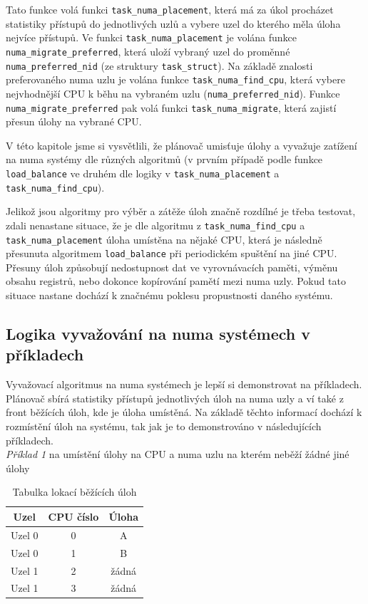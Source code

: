 \documentclass[
  field=ainfk,
  biblatex,
  glossaries,
  index
]{kidiplom}
\begin{document}
Tato funkce volá funkci \verb#task_numa_placement#, která má za úkol procházet statistiky přístupů do jednotlivých uzlů a vybere uzel do kterého měla úloha nejvíce přístupů. Ve funkci \verb#task_numa_placement# je volána funkce \newline \verb#numa_migrate_preferred#, která uloží vybraný uzel do proměnné \newline \verb#numa_preferred_nid# (ze struktury \verb#task_struct#).
Na základě znalosti preferovaného numa uzlu je volána funkce \verb#task_numa_find_cpu#, která vybere nejvhodnější CPU k běhu na vybraném uzlu (\verb#numa_preferred_nid#).
Funkce \verb#numa_migrate_preferred# pak volá funkci \verb#task_numa_migrate#, která zajistí přesun úlohy na vybrané CPU.

V této kapitole jsme si vysvětlili, že plánovač umisťuje úlohy a vyvažuje zatížení na numa systémy dle různých algoritmů (v prvním případě podle funkce \verb#load_balance# ve druhém dle logiky v \verb#task_numa_placement# a \newline \verb#task_numa_find_cpu#).

Jelikož jsou algoritmy pro výběr a zátěže úloh značně rozdílné je třeba testovat, zdali nenastane situace, že je dle algoritmu z \verb#task_numa_find_cpu# a \verb#task_numa_placement# úloha umístěna na nějaké CPU, která je následně přesunuta algoritmem \verb#load_balance# při periodickém spuštění na jiné CPU. Přesuny úloh způsobují nedostupnost dat ve vyrovnávacích paměti, výměnu obsahu registrů, nebo dokonce kopírování pamětí mezi numa uzly. Pokud tato situace nastane dochází k značnému poklesu propustnosti daného systému. \\ 

\newpage
\subsection{Logika vyvažování na numa systémech v příkladech}
Vyvažovací algoritmus na numa systémech je lepší si demonstrovat na příkladech. Plánovač sbírá statistiky přístupů jednotlivých úloh na numa uzly a ví také z front běžících úloh, kde je úloha umístěná. Na základě těchto informací dochází k rozmístění úloh na systému, tak jak je to demonstrováno v následujících příkladech. \\

\noindent
\textit{Příklad 1} na umístění úlohy na CPU a numa uzlu na kterém neběží žádné jiné úlohy

\begin{table}[h]
\centering
\begin{tabular}{|c|c|c|}
\hline
Uzel & CPU číslo & Úloha \\
\hline
Uzel 0 & 0 & A \\
\hline
Uzel 0 & 1 & B \\
\hline
Uzel 1 & 2 & žádná \\
\hline
Uzel 1 & 3 & žádná \\
\hline
\end{tabular}
\caption{Tabulka lokací běžících úloh}
\label{table2}
\end{table}
\end{document}
